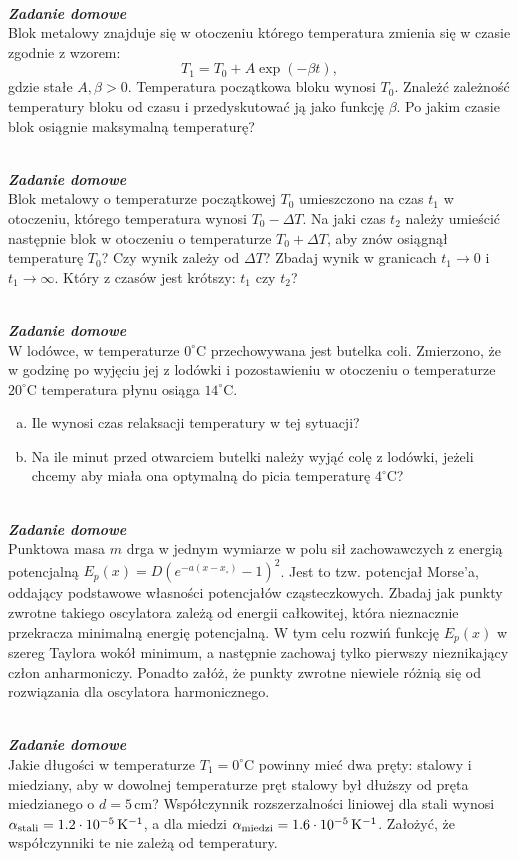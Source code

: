 \documentclass[11pt,a4paper]{article}
\newcounter{zaddom}\newcommand{\zaddom}[1][]{\addtocounter{zaddom}{1} ~\\  {\bf \emph{Zadanie domowe \arabic{zaddom} #1 }} \\}
\begin{document}
\zaddom 
Blok metalowy znajduje się w otoczeniu
którego temperatura zmienia się w czasie zgodnie z wzorem:\\
\[T_1=T_0+A\exp(-\beta t),\] gdzie stałe $A,\beta>0$. 
Temperatura początkowa bloku wynosi $T_0$. Znależć zależność
temperatury bloku od czasu i przedyskutować ją jako funkcję
$\beta$. Po jakim czasie blok osiągnie maksymalną
temperaturę?

\zaddom
Blok metalowy o temperaturze początkowej $T_0$ umieszczono na czas $t_1$ w otoczeniu,
którego temperatura wynosi $T_0-\Delta T$. Na jaki czas $t_2$ należy umieścić następnie blok
w otoczeniu o temperaturze $T_0+\Delta T$, aby znów osiągnął temperaturę $T_0$?
Czy wynik zależy od $\Delta T$? 
Zbadaj wynik w granicach $t_1\rightarrow 0$ i $t_1\rightarrow \infty$. 
Który z czasów jest krótszy: $t_1$ czy $t_2$?

\zaddom
W lodówce, w temperaturze $0^\circ$C przechowywana jest butelka coli.
Zmierzono, że w godzinę po wyjęciu jej z lodówki i pozostawieniu w otoczeniu o
temperaturze $20^\circ$C temperatura płynu osiąga $14^\circ$C.
\begin{enumerate}[a)]
\item Ile wynosi czas relaksacji temperatury w tej sytuacji?
\item Na ile minut przed otwarciem butelki należy wyjąć colę z lodówki, jeżeli
chcemy aby miała ona optymalną do picia temperaturę $4^\circ$C?
\end{enumerate}

\zaddom 
Punktowa masa $m$ drga w jednym wymiarze w polu sił zachowawczych
z energią potencjalną  \linebreak \mbox{$E_p(x) = D \left(e^{-a(x-x_\circ)}-1\right)^2$.}
Jest to tzw. potencjał Morse’a, oddający podstawowe własności potencjałów cząsteczkowych.
Zbadaj jak punkty zwrotne takiego oscylatora zależą od energii całkowitej, która nieznacznie
przekracza minimalną energię potencjalną. W tym celu rozwiń funkcję $E_p(x)$
w szereg Taylora wokół minimum, a następnie zachowaj tylko pierwszy nieznikający człon anharmoniczy. 
Ponadto załóż, że punkty zwrotne niewiele różnią się od rozwiązania dla oscylatora harmonicznego.

\zaddom
Jakie długości w temperaturze $T_1 = 0^\circ$C powinny mieć dwa pręty: stalowy i miedziany,
aby w dowolnej temperaturze pręt stalowy był dłuższy od pręta miedzianego o $d = 5\,$cm?
Współczynnik rozszerzalności liniowej dla stali wynosi
$\alpha_{\rm{stali}} = 1.2\cdot10^{-5}\,{\rm K}^{-1}$, a dla miedzi
$\alpha_{\rm{miedzi}} = 1.6\cdot 10^{-5}\,{\rm K}^{-1}$.
Założyć, że współczynniki te nie zależą od temperatury.
\end{document}
